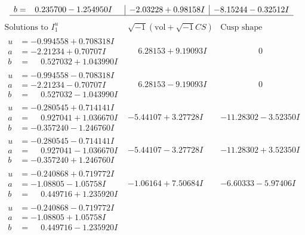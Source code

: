 \documentclass[1p]{elsarticle_modified}
\theoremstyle{definition}
\newcommand{\I}{\sqrt{-1}}
\begin{document}
$$\begin{array}{c|c|c}
\begin{aligned}
b &= \phantom{-}0.235700 - 1.254950 I\end{aligned}
 & -2.03228 + 0.98158 I & -8.15244 - 0.32512 I\\
 \hline 
 \end{array}$$\newpage$$\begin{array}{c|c|c}  
\text{Solutions to }I^u_{1}& \I (\text{vol} + \sqrt{-1}CS) & \text{Cusp shape}\\
 \hline 
\begin{aligned}
u &= -0.994558 + 0.708318 I \\
a &= -2.21234 + 0.70707 I \\
b &= \phantom{-}0.527032 + 1.043990 I\end{aligned}
 & \phantom{-}6.28153 + 9.19093 I & \phantom{-0.000000 } 0 \\ \hline\begin{aligned}
u &= -0.994558 - 0.708318 I \\
a &= -2.21234 - 0.70707 I \\
b &= \phantom{-}0.527032 - 1.043990 I\end{aligned}
 & \phantom{-}6.28153 - 9.19093 I & \phantom{-0.000000 } 0 \\ \hline\begin{aligned}
u &= -0.280545 + 0.714141 I \\
a &= \phantom{-}0.927041 + 1.036670 I \\
b &= -0.357240 - 1.246760 I\end{aligned}
 & -5.44107 + 3.27728 I & -11.28302 - 3.52350 I \\ \hline\begin{aligned}
u &= -0.280545 - 0.714141 I \\
a &= \phantom{-}0.927041 - 1.036670 I \\
b &= -0.357240 + 1.246760 I\end{aligned}
 & -5.44107 - 3.27728 I & -11.28302 + 3.52350 I \\ \hline\begin{aligned}
u &= -0.240868 + 0.719772 I \\
a &= -1.08805 - 1.05758 I \\
b &= \phantom{-}0.449716 + 1.235920 I\end{aligned}
 & -1.06164 + 7.50684 I & -6.60333 - 5.97406 I \\ \hline\begin{aligned}
u &= -0.240868 - 0.719772 I \\
a &= -1.08805 + 1.05758 I \\
b &= \phantom{-}0.449716 - 1.235920 I\end{aligned}

\end{array}$$
\end{document}
